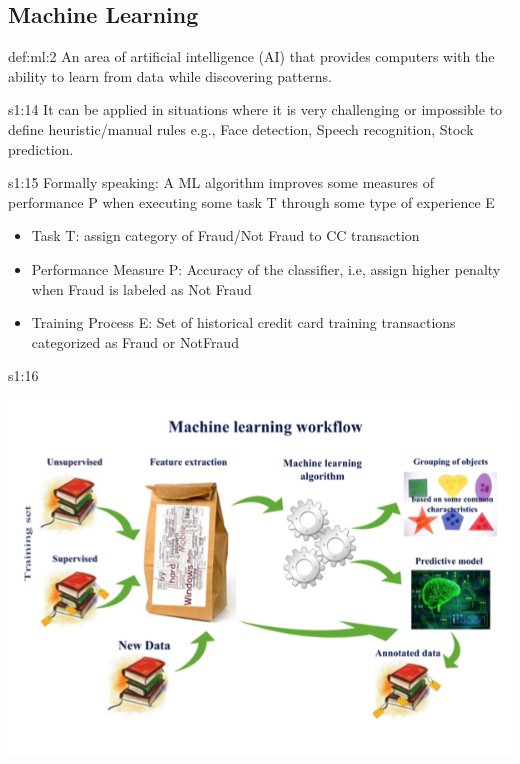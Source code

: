 \documentclass{tron}
\begin{document}
\subsection{Machine Learning}
\begin{definition}{def:ml:2}
	An area of artificial intelligence (AI) that provides computers with the ability to learn from data while discovering patterns. 
\end{definition}
\begin{remark}[]{s1:14}
	It can be applied in situations where it is very challenging or impossible to define heuristic/manual rules e.g., Face detection, Speech recognition, Stock prediction.
\end{remark}
\begin{example}{s1:15}
	Formally speaking: A ML algorithm improves some measures of performance P when executing some task T through some type of experience E
	\begin{itemize}
		\item Task T: assign category of Fraud/Not Fraud to CC transaction
		\item Performance Measure P: Accuracy of the classifier, i.e, assign higher penalty when Fraud is labeled as Not Fraud
		\item Training Process E: Set of historical credit card training transactions categorized as Fraud or NotFraud
	\end{itemize}
\end{example}
\begin{remark}{s1:16}
	\begin{center}
		\includegraphics[width=0.8\columnwidth]{Figs/Slide2/ml workflow}
	\end{center}
\end{remark}
\end{document}
